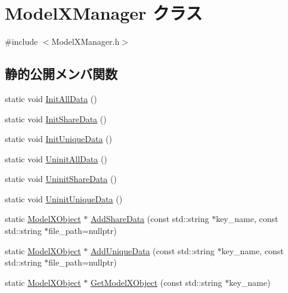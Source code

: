 \hypertarget{class_model_x_manager}{}\section{Model\+X\+Manager クラス}
\label{class_model_x_manager}


{\ttfamily \#include $<$Model\+X\+Manager.\+h$>$}

\subsection*{静的公開メンバ関数}
\begin{DoxyCompactItemize}
\item 
static void \mbox{\hyperlink{class_model_x_manager_a8d7965d9eaa41fcf0297eebea287ee82}{Init\+All\+Data}} ()
\item 
static void \mbox{\hyperlink{class_model_x_manager_a8096a9ed1b19c41270df944aa855015a}{Init\+Share\+Data}} ()
\item 
static void \mbox{\hyperlink{class_model_x_manager_a9bed6cb5ffcd2cbfec6c405e21af362e}{Init\+Unique\+Data}} ()
\item 
static void \mbox{\hyperlink{class_model_x_manager_a915bf3c57058e235d91db06f3fe5f538}{Uninit\+All\+Data}} ()
\item 
static void \mbox{\hyperlink{class_model_x_manager_a9e3d0dc8addebebc87f450cde6c5e659}{Uninit\+Share\+Data}} ()
\item 
static void \mbox{\hyperlink{class_model_x_manager_a7dde269502f40b7d1208c8e0f84b13f0}{Uninit\+Unique\+Data}} ()
\item 
static \mbox{\hyperlink{class_model_x_object}{Model\+X\+Object}} $\ast$ \mbox{\hyperlink{class_model_x_manager_a395565622dff14d4ff80bf64611f9a36}{Add\+Share\+Data}} (const std\+::string $\ast$key\+\_\+name, const std\+::string $\ast$file\+\_\+path=nullptr)
\item 
static \mbox{\hyperlink{class_model_x_object}{Model\+X\+Object}} $\ast$ \mbox{\hyperlink{class_model_x_manager_a0a0cd728e7b92de6c18e96026708d97b}{Add\+Unique\+Data}} (const std\+::string $\ast$key\+\_\+name, const std\+::string $\ast$file\+\_\+path=nullptr)
\item 
static \mbox{\hyperlink{class_model_x_object}{Model\+X\+Object}} $\ast$ \mbox{\hyperlink{class_model_x_manager_a70cc89b8314e5e91b74770606c734c97}{Get\+Model\+X\+Object}} (const std\+::string $\ast$key\+\_\+name)
\end{DoxyCompactItemize}
